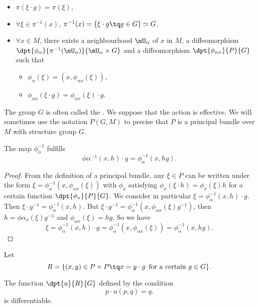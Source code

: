 \begin{itemize}
\item $\pi(\xi\cdot g)=\pi(\xi)$,
\item $\forall \xi\in\pi^{-1}(x)$, $\pi^{-1}(x)=\{\xi\cdot g\tq g\in G\}\simeq G$,
\item $\forall x\in M$, there exists a neighbourhood $\mU_{\alpha}$ of $x$ in $M$, a diffeomorphism $\dpt{\phi_{\alpha}}{\pi^{-1}(\mU_{\alpha})}{\mU_{\alpha}\times G}$ and a diffeomorphism $\dpt{\phi_{\alpha x}}{P}{G}$ such that

\begin{itemize}
\item $\phi_{\alpha}(\xi)=(x,\phi_{\alpha x}(\xi))$,
\item $\phi_{\alpha x}(\xi\cdot g)=\phi_{\alpha x}(\xi)\cdot g$.
\end{itemize}
\end{itemize}
The group $G$ is often called the . We suppose that the action is effective. We will sometimes use the notation $P(G,M)$ to precise that $P$ is a principal bundle over $M$ with structure group $G$.

\begin{lemma}\label{lem:phixh}
The map $\phi_{\alpha}^{-1}$ fulfills
\[
  \phi\alpha^{-1}(x,h)\cdot g=\phi_{\alpha}^{-1}(x,hg).
\]
\end{lemma}

\begin{proof}

From the definition of a principal bundle, any $\xi\in P$ can be written under the form $\xi=\phi_{\alpha}^{-1}(x,\phi_{\alpha x}(\xi))$ with $\phi_x$ satisfying $\phi_x(\xi\cdot h)=\phi_x(\xi)h$ for a certain function $\dpt{\phi_x}{P}{G}$.  We consider in particular $\xi=\phi_{\alpha}^{-1}(x,h)\cdot g$. Then $\xi\cdot g^{-1}=\phi_{\alpha}^{-1}(x,h)$. But $\xi\cdot g^{-1}=\phi_{\alpha}^{-1}(x,\phi_{\alpha x}(\xi)g^{-1})$, then $h=\phi{\alpha_x}(\xi)g^{-1}$ and $\phi_{\alpha x}(\xi)=hg$. So we have
\[
\xi=\phi_{\alpha}^{-1}(x,h)\cdot g=\phi_{\alpha}^{-1}(x,\phi_{\alpha x}(\xi))=\phi_{\alpha}^{-1}(x,hg).
\]

\end{proof}

Let 
\[
   R=\{ (x,y)\in P\times P\tq x=y\cdot g\,\textrm{ for a certain $g\in G$}  \}.
\]

\begin{proposition}
The function $\dpt{u}{R}{G}$ defined by the condition
\[
  p\cdot u(p,q)=q.
\]
is differentiable.
\end{proposition}

